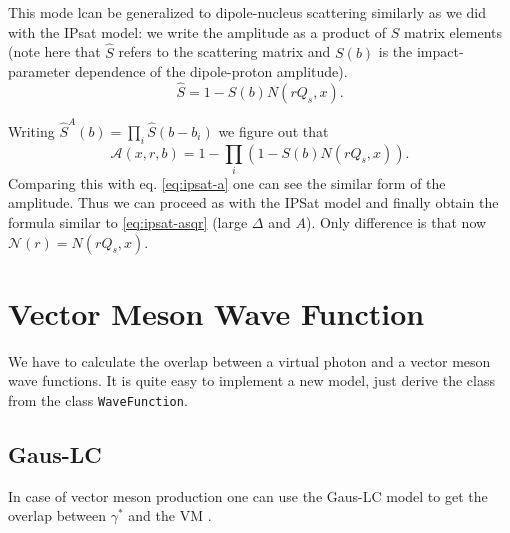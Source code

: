 \documentclass[a4paper,12pt]{article}
\newcommand{\code}[1]{\texttt{#1}}
\newcommand{\der}{\mathrm{d}}
\newcommand{\A}{\mathcal{A}}
\newcommand{\N}{\mathcal{N}}
\begin{document}

This mode lcan be generalized to dipole-nucleus scattering similarly as we did with the IPsat model: we write the amplitude as a product of $\hat S$ matrix elements (note here that $\hat S$ refers to the scattering matrix and $S(b)$ is the impact-parameter dependence of the dipole-proton amplitude). 
\begin{equation}
	\hat S = 1-S(b)N(rQ_s,x).
\end{equation}

Writing $\hat S^A(b) = \prod_i \hat S(b-b_i)$ we figure out that
\begin{equation}
	\A(x,r,b) = 1 - \prod_i \left( 1-S(b)N(rQ_s,x) \right).
\end{equation}
Comparing this with eq. \eqref{eq:ipsat-a} one can see the similar form of the amplitude. Thus we can proceed as with the IPSat model and finally obtain the formula similar to \eqref{eq:ipsat-asqr} (large $\Delta$ and $A$). Only difference is that now $\N(r)=N(rQ_s,x)$.

\section{Vector Meson Wave Function}
We have to calculate the overlap between a virtual photon and a vector meson wave functions. It is quite easy to implement a new model, just derive the class from the class \code{WaveFunction}.

\subsection{Gaus-LC}
In case of vector meson production one can use the Gaus-LC model to get the overlap between $\gamma^*$ and the VM \cite{Kowalski:2006hc}.
\end{document}
